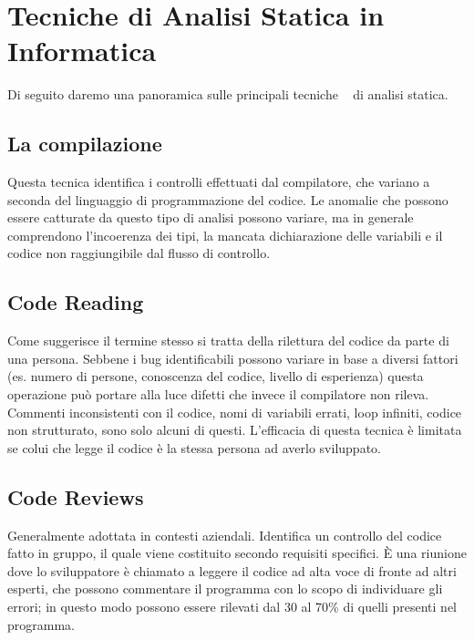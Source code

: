 \section{Tecniche di Analisi Statica in Informatica}

Di seguito daremo una panoramica sulle principali tecniche ~\cite{analisi-statica-unina} di analisi statica.

    \subsection{La compilazione}
    

    Questa tecnica identifica i controlli effettuati dal compilatore, che variano a seconda del linguaggio di programmazione del codice. Le anomalie che possono essere catturate da questo tipo di analisi possono variare, ma in generale comprendono l'incoerenza dei tipi, la mancata dichiarazione delle variabili e il codice non raggiungibile dal flusso di controllo.\newline 

    \subsection{Code Reading}

    Come suggerisce il termine stesso si tratta della rilettura del codice da parte di una persona. Sebbene i bug identificabili possono variare in base a diversi fattori (es. numero di persone, conoscenza del codice, livello di esperienza) questa operazione può portare alla luce difetti che invece il compilatore non rileva. Commenti inconsistenti con il codice, nomi di variabili errati, loop infiniti, codice non strutturato, sono solo alcuni di questi. L'efficacia di questa tecnica è limitata se colui che legge il codice è la stessa persona ad averlo sviluppato.\newline

    \subsection{Code Reviews}

    Generalmente adottata in contesti aziendali. Identifica un controllo del codice fatto in gruppo, il quale viene costituito secondo requisiti specifici. \`E una riunione dove lo sviluppatore è chiamato a leggere il codice ad alta voce di fronte ad altri esperti, che possono commentare il programma con lo scopo di individuare gli errori; in questo modo possono essere rilevati dal 30 al 70\% di quelli presenti nel programma.\newline

